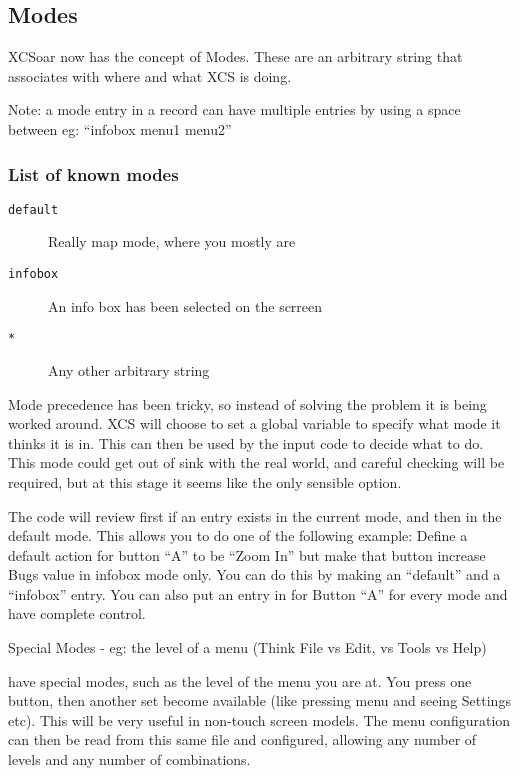 \subsection{Modes}

XCSoar now has the concept of Modes. These are an arbitrary
string that associates with where and what XCS is doing.

Note: a mode entry in a record can have multiple entries by using a space
between eg: ``infobox menu1 menu2''

\subsubsection{List of known modes}

\begin{description}
\item[\texttt{default}] Really map mode, where you mostly are
\item[\texttt{infobox}] An info box has been selected on the scrreen
\item[\texttt{*}] Any other arbitrary string
\end{description}

Mode precedence has been tricky, so instead of solving the problem 
it is being worked around. XCS will choose to set a global variable 
to specify what mode it thinks it is in. This can then be used by the
input code to decide what to do. This mode could get out of sink
with the real world, and careful checking will be required, but at
this stage it seems like the only sensible option.

The code will review first if an entry exists in the current mode, and 
then in the default mode. This allows you to do one of the following
example: Define a default action for button ``A'' to be ``Zoom In'' but
make that button increase Bugs value in infobox mode only. You can do
this by making an ``default'' and a ``infobox'' entry. You can also put an entry
in for Button ``A'' for every mode and have complete control.

Special Modes - eg: the level of a menu (Think File vs Edit, vs Tools vs Help)

have special modes, such as
the level of the menu you are at. You press one button, then another
set become available (like pressing menu and seeing Settings etc). This
will be very useful in non-touch screen models. The menu configuration
can then be read from this same file and configured, allowing any
number of levels and any number of combinations.

